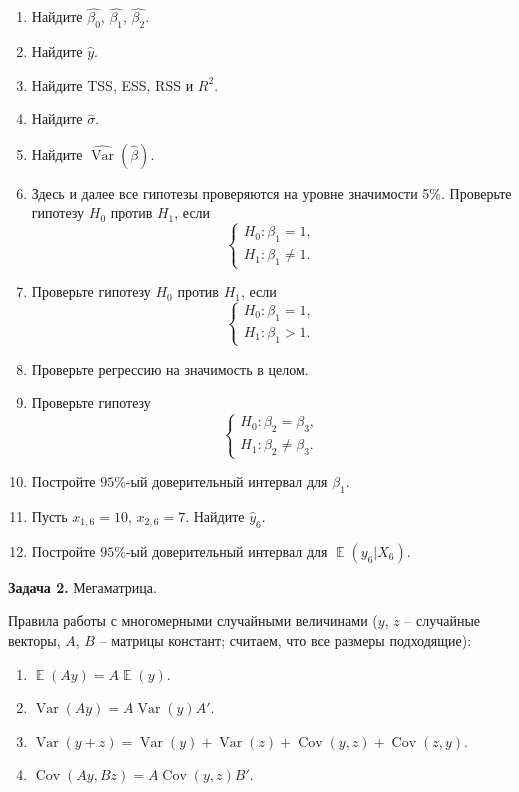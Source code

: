 \documentclass[10pt, a4paper]{extarticle}
\DeclareMathOperator{\cov}{Cov}
\DeclareMathOperator{\Var}{Var}
\DeclareMathOperator{\E}{\mathbb{E}}
\begin{document}
	\begin{enumerate}[label = \alph*)]
		\item Найдите $\hat{\beta_0}$, $\hat{\beta_1}$, $\hat{\beta_2}$.
		\item Найдите $\hat{y}$.
		\item Найдите TSS, ESS, RSS и $R^2$.
		\item Найдите $\hat{\sigma}$.
		\item Найдите $\widehat{\Var}(\hat{\beta})$.
		\item Здесь и далее все гипотезы проверяются на уровне значимости 5\%. Проверьте гипотезу $H_0$ против $H_1$, если
		\[
		\begin{cases}
		H_0: \beta_1 = 1, \\
		H_1: \beta_1 \ne 1.
		\end{cases}
		\]
		\item Проверьте гипотезу $H_0$ против $H_1$, если
		\[
		\begin{cases}
			H_0: \beta_1 = 1, \\
			H_1: \beta_1 > 1.
		\end{cases}
		\]
		\item Проверьте регрессию на значимость в целом.
		\item Проверьте гипотезу
		\[
		\begin{cases}
			H_0: \beta_2 = \beta_3, \\
			H_1: \beta_2 \ne \beta_3.
		\end{cases}
		\]
		\item Постройте $95\%$-ый доверительный интервал для $\beta_1$.
		\item Пусть $x_{1, 6} = 10$, $x_{2, 6} = 7$. Найдите $\hat{y}_6$.
		\item Постройте $95\%$-ый доверительный интервал для $\E(y_6 | X_6)$.
	\end{enumerate}
	\newpage
	
	
	{\Large \textbf{Задача 2.} Мегаматрица.}
	
	Правила работы с многомерными случайными величинами ($y$, $z$ -- случайные векторы, $A$, $B$ -- матрицы констант; считаем, что все размеры подходящие):
	\begin{enumerate}
		\item $\E(Ay) = A\E(y)$.
		\item $\Var(Ay) = A\Var(y)A'$.
		\item $\Var(y + z) = \Var(y) + \Var(z) + \cov(y, z) + \cov(z, y)$.
		\item $\cov(Ay, Bz) = A\cov(y, z)B'$.
	\end{enumerate}
\end{document}
